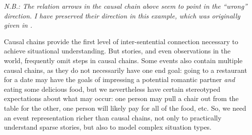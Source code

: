 \textit{N.B.: The relation arrows in the causal chain above seem to point in the ``wrong'' direction. I have preserved their direction in this example, which was originally given in \citep{schankandabelson}.}

Causal chains provide the first level of inter-sentential connection necessary to achieve situational understanding. But stories, and even observations in the world, frequently omit steps in causal chains. Some events also contain multiple causal chains, as they do not necessarily have one end goal: going to a restaurant for a date may have the goals of impressing a potential romantic partner \textit{and} eating some delicious food, but we nevertheless have certain stereotyped expectations about what may occur: one person may pull a chair out from the table for the other, one person will likely pay for all of the food, etc. So, we need an event representation richer than causal chains, not only to practically understand sparse stories, but also to model complex situation types.
\fi